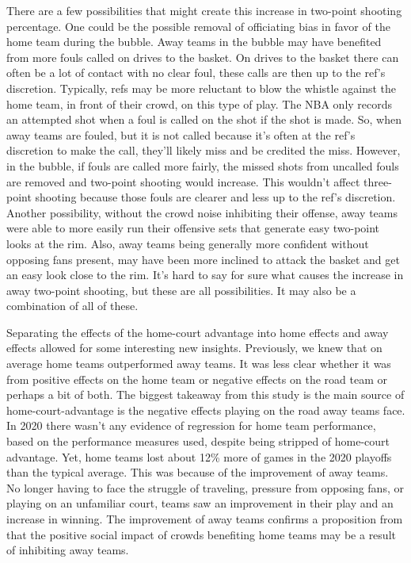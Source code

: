 \documentclass[10pt]{article}
\begin{document}
There are a few possibilities that might create this increase in two-point shooting
percentage. One could be the possible removal of officiating bias in favor of the 
home team during the bubble. Away teams in the bubble may have benefited from more 
fouls called on drives to the basket. On drives to the basket there can often be a 
lot of contact with no clear foul, these calls are then up to the ref's discretion.
Typically, refs may be more reluctant to blow the whistle against the home team, in
front of their crowd, on this type of play. The NBA only records an attempted shot 
when a foul is called on the shot if the shot is made. So, when away teams are 
fouled, but it is not called because it's often at the ref's discretion to make 
the call, they'll likely miss and be credited the miss. However, in the bubble, if
fouls are called more fairly, the missed shots from uncalled fouls are removed and 
two-point shooting would increase. This wouldn't affect three-point shooting because
those fouls are clearer and less up to the ref's discretion. Another possibility,
without the crowd noise inhibiting their offense, away teams were able to more 
easily run their offensive sets that generate easy two-point looks at the rim. 
Also, away teams being generally more confident without opposing fans present, 
may have been more inclined to attack the basket and get an easy look close to 
the rim. It's hard to say for sure what causes the increase in away two-point shooting,
but these are all possibilities. It may also be a combination of all of these. 


Separating the effects of the home-court advantage into home effects and away
effects allowed for some interesting new insights. Previously, we knew that on
average home teams outperformed away teams. It was less clear whether it was
from positive effects on the home team or negative effects on the road team or
perhaps a bit of both. The biggest takeaway from this study is the main source
of home-court-advantage is the negative effects playing on the road away teams
face. In 2020 there wasn't any evidence of regression for home team performance,
based on the performance measures used, despite being stripped of home-court
advantage. Yet, home teams lost about 12\% more of games in the 2020 playoffs
than the typical average. This was because of the improvement of away teams.
No longer having to face the struggle of traveling, pressure from opposing fans,
or playing on an unfamiliar court, teams saw an improvement in their play and an
increase in winning. The improvement of away teams confirms a proposition from
\citet{Greer} that the positive social impact of crowds benefiting
home teams may be a result of inhibiting away teams.
\end{document}

